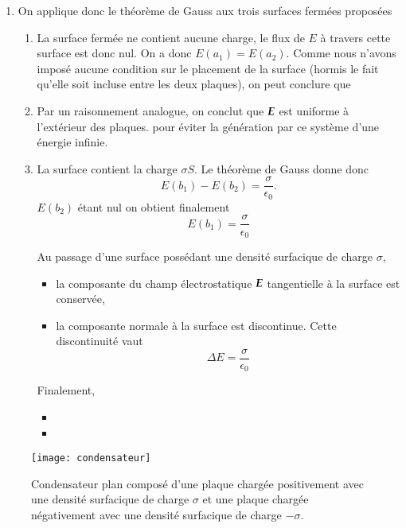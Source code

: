 \begin{corrige}
\begin{enumerate}
 	 \item On applique donc le théorème de Gauss aux trois surfaces fermées
	       proposées
	       \begin{enumerate}
		       \item La surface fermée ne contient aucune charge, le flux
			     de $E$ à travers cette surface est donc nul. On a donc
			     $E(a_1) = E(a_2)$. Comme nous n'avons imposé aucune condition
			     sur le placement de la surface (hormis le fait
			     qu'elle soit incluse entre les deux plaques), on peut
			     conclure que 
		       \item Par un raisonnement analogue, on conclut que $\vece$
			     est uniforme à l'extérieur des plaques.  pour éviter la génération
		     par ce système d'une énergie infinie.
	     		\item La surface contient la charge $\sigma S$. Le théorème de
			Gauss donne donc
			\begin{equation*}
			E(b_1) - E(b_2) = \dfrac{\sigma}{\epsilon_0}.
			\end{equation*}
			$E(b_2)$ étant nul on obtient finalement
			\begin{equation*}
				E(b_1) = \dfrac{\sigma}{\epsilon_0}
			\end{equation*}
			\begin{defn}
				Au passage d'une surface possédant une densité surfacique de
				charge $\sigma$, 
				\begin{itemize}
					\item la composante du champ électrostatique
					      $\vece$ tangentielle à la surface est
					      conservée,
					 \item la composante normale à la surface est 
					       discontinue. Cette discontinuité vaut
					       \begin{equation}
						       \Delta E = \dfrac{\sigma}{\epsilon_0}
					       \end{equation}
			      \end{itemize}
			\end{defn}
			Finalement,
			\begin{itemize}
				\item {}
				\item {}
		      \end{itemize}
	       \end{enumerate}
\end{enumerate}
\end{corrige}
\begin{figure}[h]
	\centering
	\texttt{[image: condensateur]}
	\caption{Condensateur plan composé d'une plaque chargée positivement avec 
	         une densité surfacique de charge $\sigma$ et une plaque chargée
	 	 négativement avec une densité surfacique de charge $-\sigma$.}%
	\label{fig:condensateur}
\end{figure}

